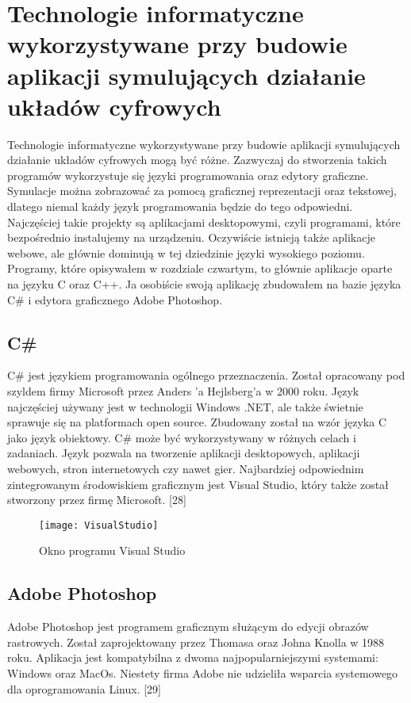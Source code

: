\documentclass[12pt, a4paper, onside, polish]{article}				%
\begin{document}
\cleardoublepage



\section{Technologie informatyczne wykorzystywane przy budowie aplikacji symulujących działanie układów cyfrowych}
\hspace{\parindent}
Technologie informatyczne wykorzystywane przy budowie aplikacji symulujących działanie układów cyfrowych mogą być różne. Zazwyczaj do stworzenia takich programów wykorzystuje się języki programowania oraz edytory graficzne. Symulacje można zobrazować za pomocą graficznej reprezentacji oraz tekstowej, dlatego niemal każdy język programowania będzie do tego odpowiedni. Najczęściej takie projekty są aplikacjami desktopowymi, czyli programami, które bezpośrednio instalujemy na urządzeniu. Oczywiście istnieją także aplikacje webowe, ale głównie dominują w tej dziedzinie języki wysokiego poziomu. Programy, które opisywałem w rozdziale czwartym, to głównie aplikacje oparte na języku C oraz C++. Ja osobiście swoją aplikację zbudowałem na bazie języka C\# i edytora graficznego Adobe Photoshop.  
\subsection{C\#}
\hspace{\parindent}
C\# jest językiem programowania ogólnego przeznaczenia. Został opracowany pod szyldem firmy Microsoft przez Anders 'a Hejlsberg’a w 2000 roku. Język najczęściej używany jest w technologii Windows .NET, ale także świetnie sprawuje się na platformach open source. Zbudowany został na wzór języka C jako język obiektowy. C\# może być wykorzystywany w różnych celach i zadaniach. Język pozwala na tworzenie aplikacji desktopowych, aplikacji webowych, stron internetowych czy nawet gier. Najbardziej odpowiednim zintegrowanym środowiskiem graficznym jest Visual Studio, który także został stworzony przez firmę Microsoft. [28]
   	\begin{figure}[H]
  	  {\centering \texttt{[image: VisualStudio]} \caption{Okno programu Visual Studio}}\vspace{5mm}
  	 \end{figure}




\subsection{Adobe Photoshop}
\hspace{\parindent}
Adobe Photoshop jest programem graficznym służącym do edycji obrazów rastrowych. Został zaprojektowany przez Thomasa oraz Johna Knolla w 1988 roku. Aplikacja jest kompatybilna z dwoma najpopularniejszymi systemami: Windows oraz MacOs. Niestety firma Adobe nie udzieliła wsparcia systemowego dla oprogramowania Linux. [29]  
\end{document}
